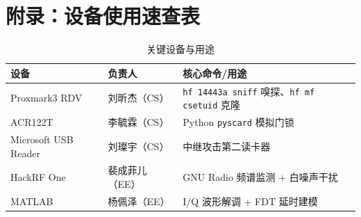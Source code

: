 \documentclass[12pt,a4paper]{ctexart}
\begin{document}
\section{附录：设备使用速查表}

\begin{table}[h]
\centering
\caption{关键设备与用途}
\begin{tabular}{lll}
\toprule
\textbf{设备} & \textbf{负责人} & \textbf{核心命令/用途} \\
\midrule
Proxmark3 RDV & 刘昕杰（CS） & \texttt{hf 14443a sniff} 嗅探、\texttt{hf mf csetuid} 克隆 \\
ACR122T & 李毓霖（CS） & Python \texttt{pyscard} 模拟门锁 \\
Microsoft USB Reader& 刘璨宇（CS） & 中继攻击第二读卡器 \\
HackRF One & 裴成菲儿（EE）& GNU Radio 频谱监测 + 白噪声干扰 \\
MATLAB & 杨佩泽（EE） & I/Q 波形解调 + FDT 延时建模 \\
\bottomrule
\end{tabular}
\end{table}
\end{document}
